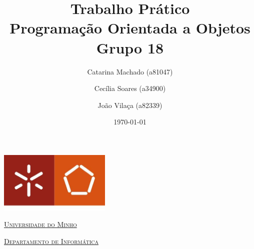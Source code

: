 \documentclass[a4paper]{article}
\begin{document}
\title{Trabalho Prático\\ Programação Orientada a Objetos\\Grupo 18}
\author{Catarina Machado (a81047) \and Cecília Soares (a34900) \and João Vilaça (a82339)}
\date{\today}

\begin{titlepage}

  \thispagestyle{empty}
  \begin{center}
  \begin{minipage}{0.75\linewidth}
      \centering
      \includegraphics[width=0.4\textwidth]{imgs/eng.jpeg}\par\vspace{1cm}
      \vspace{1.5cm}
      \href{https://www.uminho.pt/PT}{\scshape\LARGE Universidade do Minho} \par
      \vspace{1cm}
      \href{https://www.di.uminho.pt/}{\scshape\Large Departamento de Informática} \par
      \vspace{1.5cm}

  \maketitle
  \end{minipage}
  \end{center}

  \vspace{2cm}


\end{titlepage}
\end{document}
